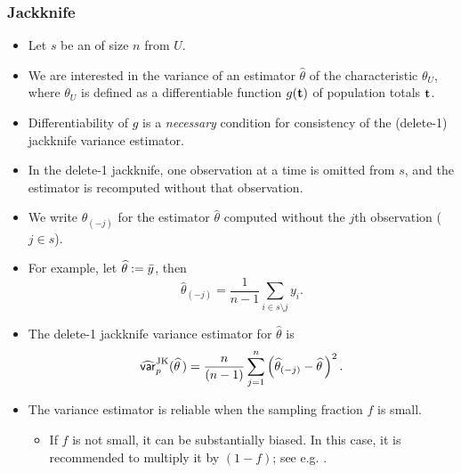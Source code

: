 \documentclass{my_eth_beamer}
\numberwithin{equation}{section}
\begin{document}
\begin{frame}
    \frametitle{\large Jackknife}
    \begin{itemize}
    \setlength{\itemsep}{12pt}
        \item Let $s$ be an \SRS of size $n$ from $U$.
        \item We are interested in the variance of an estimator
            $\widehat{\theta}$ of the characteristic $\theta_U$, where
            $\theta_U$ is defined as a \alert{differentiable} function
            $g(\bold t)$ of population totals $\bold t$.
        \item \alert{Differentiability} of $g$ is a \emph{necessary}
            condition \citep{krewski_rao_1981} for consistency of the
            (delete-1) jackknife variance estimator.
        \item In the \alert{delete-1 jackknife}, one observation at a time is
            omitted from $s$, and the estimator is recomputed without that
            observation.
        \item We write $\widehat{\theta}_{(-j)}$ for the estimator
            $\widehat{\theta}$ computed \alert{without} the $j$th observation
            ($j\in s$).
    \end{itemize}
\end{frame}

\begin{frame}
    \begin{itemize}
    \setlength{\itemsep}{10pt}
        \item For example, let $\widehat{\theta}:=\bar{y}$, then
            \begin{equation*}
                \widehat{\theta}_{(-j)} = \frac{1}{n - 1}
                    \sum_{i\in s\setminus j} y_i.
            \end{equation*}
        \item The delete-1 jackknife \alert{variance estimator} for
            $\widehat{\theta}$ is
            \begin{equation*}
                \widehat{\mathsf{var}}_p^{\mathrm{JK}}(\widehat{\theta}\,) = \frac{n}{(n
                - 1)} \sum_{j = 1}^n \left(\widehat{\theta}_{(-j)} -
                \widehat{\theta}\,\right)^2.
            \end{equation*}
        \item The variance estimator is reliable when the sampling fraction $f$
            is \alert{small}.
            \vspace{0.5em}
            \begin{itemize}
            \setlength{\itemsep}{2pt}
                \item[\goto] If $f$ is \alert{not small}, it can be
                    substantially biased. In this case, it is recommended to
                    multiply it by $(1-f)$; see e.g.
                    \citet[][p.~167]{wolter_2007}.
            \end{itemize}
    \end{itemize}
\end{frame}
\end{document}
